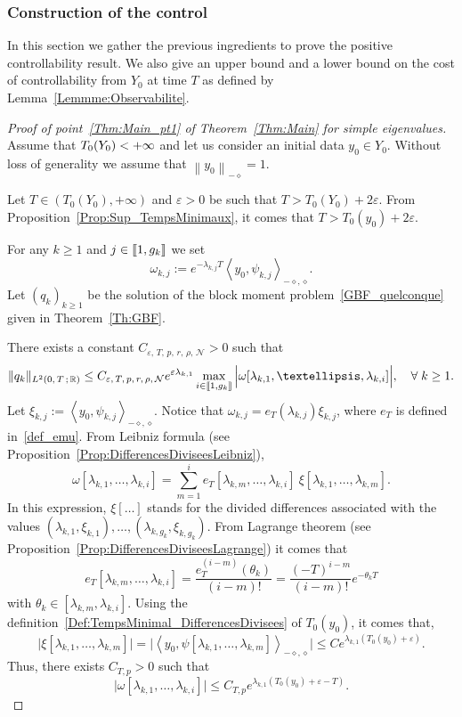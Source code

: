 \documentclass[11pt]{article}
\theoremstyle{definition}
\numberwithin{equation}{section}
\numberwithin{figure}{section}
\numberwithin{table}{section}
\newcommand{\llbracket}{\mathopen{[\mkern -2.7mu[}}
\newcommand{\rrbracket}{\mathclose{]\mkern -2.7mu]}}
\newcommand{\inter}[2]{\llbracket #1,#2 \rrbracket}
\newcommand{\Fzp}{Y_0}
\newcommand{\normeXmalpha}[1]{\left\| #1 \right\|_{-\diamond}}
\newcommand{\dual}[2]{\left\langle #1, #2 \right\rangle_{-\diamond,\diamond}}
\newcommand{\n}{g}
\newcommand{\NN}{\mathcal{N}}
\newcommand{\R}{\mathbb{R}}
\let\oldforall\forall
\renewcommand*{\forall}{\mathrel{\oldforall}}
\begin{document}
\subsubsection{Construction of the control} \label{Subsec:ConstructionControle}
In this section we gather the previous ingredients to prove the positive controllability result. We also give an upper bound and a lower bound on the cost of controllability from $\Fzp$ at time $T$ as defined by Lemma~\ref{Lemmme:Observabilite}.
\begin{proof}[Proof of point~\eqref{Thm:Main_pt1} of Theorem~\ref{Thm:Main} for simple eigenvalues]
Assume that $T_0(\Fzp)\linebreak <+\infty$ and let us consider an initial data $y_0\in \Fzp$. Without loss of generality we assume that $\normeXmalpha{y_0}=1$.

Let $T\in (T_0(\Fzp), +\infty)$ and $\varepsilon >0$ be such that $T> T_0(\Fzp) + 2\varepsilon$. From Proposition~\ref{Prop:Sup_TempsMinimaux}, it comes that $T> T_0(y_0) + 2\varepsilon$.

For any $k \geq 1$ and $j \in \inter{1}{\n_k}$ we set
\[
\omega_{k,j} := e^{-\lambda_{k,j} T} \dual{y_0}{\psi_{k,j}}.
\]
Let $(q_k)_{k \geq 1}$ be the solution of the block moment problem~\eqref{GBF_quelconque} given in Theorem~\ref{Th:GBF}.

There exists a constant $C_{\varepsilon,\,T,\, p,\, r,\, \rho,\, \NN} >0$ such that
\[
\| q_k \|_{L^2(0,\,T\,;\,\R)} \leq C_{\varepsilon,\,T,\,p,\,r,\,\rho,\,\NN} e^{\varepsilon \lambda_{k,1} }
\max \limits_{i\in \inter{1}{\n_k}} \Big| \omega[\lambda_{k,1}, \dots, \lambda_{k,i}] \Big|, \quad \forall k \geq 1.
\]
Let $\xi_{k,j} := \dual{y_0}{\psi_{k,j}}$. Notice that $\omega_{k,j} = e_T(\lambda_{k,j}) \xi_{k,j}$, where $e_T$ is defined in~\eqref{def_emu}. From Leibniz formula (see Proposition~\ref{Prop:DifferencesDiviseesLeibniz}),
\begin{equation}\label{GBF_Leibniz_omega}
\omega[\lambda_{k,1},\dots,\lambda_{k,i}] = \sum_{m=1}^i e_T[\lambda_{k,m},\dots,\lambda_{k,i}] \: \xi[\lambda_{k,1}, \dots, \lambda_{k,m}].
\end{equation}
In this expression, $\xi[\dots]$ stands for the divided differences associated with the values $(\lambda_{k,1}, \xi_{k,1}), \dots,(\lambda_{k,\n_k},\xi_{k,\n_k})$. From Lagrange theorem (see Proposition~\ref{Prop:DifferencesDiviseesLagrange}) it comes that
\[
e_T[\lambda_{k,m},\dots,\lambda_{k,i}] = \frac{e_T^{(i-m)}(\theta_k)}{(i-m)!} = \frac{(-T)^{i-m}}{(i-m)!} e^{-\theta_k T}
\]
with $\theta_k \in [\lambda_{k,m}, \lambda_{k,i}]$. Using the definition~\eqref{Def:TempsMinimal_DifferencesDivisees} of $T_0(y_0)$, it comes that,
\begin{equation}\label{GBF_Estimee_Xi_kj}
\big| \xi[\lambda_{k,1}, \dots, \lambda_{k,m}] \big| = \big| \dual{y_0}{\psi[\lambda_{k,1}, \dots, \lambda_{k,m}]} \big| \leq C e^{\lambda_{k,1} (T_0(y_0) + \varepsilon)}.
\end{equation}
Thus, there exists $C_{T, p} >0$ such that
\[
\big| \omega[\lambda_{k,1}, \dots, \lambda_{k,i}] \big| \leq C_{T,p} e^{\lambda_{k,1} (T_0(y_0) +\varepsilon - T)}.
\]


\end{proof}
\end{document}
